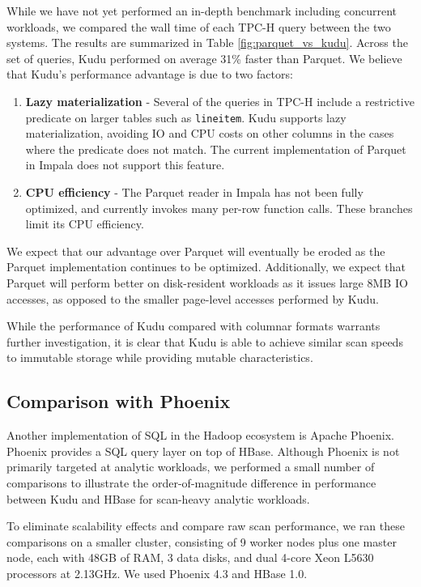 \documentclass[twocolumn,9pt]{article}
\begin{document}
While we have not yet performed an in-depth benchmark including concurrent workloads, we compared
the wall time of each TPC-H query between the two systems. The results are summarized in Table \ref{fig:parquet_vs_kudu}.
Across the set of queries, Kudu performed on average 31\% faster than Parquet. We believe that Kudu's performance
advantage is due to two factors:
\begin{enumerate}
\item {\bf Lazy materialization} - Several of the queries in TPC-H include a restrictive predicate
  on larger tables such as {\tt lineitem}. Kudu supports lazy materialization, avoiding IO and
  CPU costs on other columns in the cases where the predicate does not match. The current
  implementation of Parquet in Impala does not support this feature.
\item {\bf CPU efficiency} - The Parquet reader in Impala has not been fully optimized,
  and currently invokes many per-row function calls. These branches limit its CPU efficiency.
\end{enumerate}

We expect that our advantage over Parquet will eventually be eroded as the Parquet implementation
continues to be optimized. Additionally, we expect that Parquet will perform better on disk-resident
workloads as it issues large 8MB IO accesses, as opposed to the smaller page-level accesses performed by Kudu.

While the performance of Kudu compared with columnar formats warrants further investigation, it is clear that
Kudu is able to achieve similar scan speeds to immutable storage while providing mutable characteristics.

\subsection{Comparison with Phoenix}
\label{sec:phoenix}

Another implementation of SQL in the Hadoop ecosystem is Apache Phoenix\cite{phoenix}. Phoenix
provides a SQL query layer on top of HBase. Although Phoenix is not primarily
targeted at analytic workloads, we performed a small number of comparisons to illustrate the
order-of-magnitude difference in performance between Kudu and HBase for scan-heavy analytic
workloads.

To eliminate scalability effects and compare raw scan performance, we ran these comparisons on
a smaller cluster, consisting of 9 worker nodes plus one master node, each with
48GB of RAM, 3 data disks, and dual 4-core Xeon L5630 processors at 2.13GHz.
We used Phoenix 4.3 and HBase 1.0.
\end{document}
